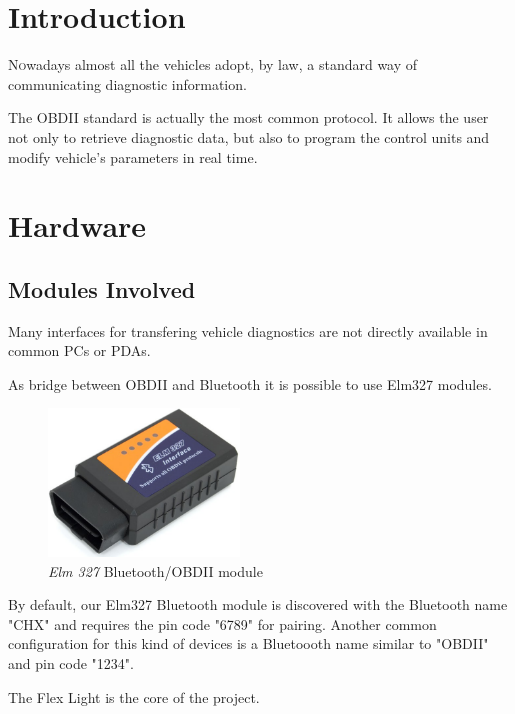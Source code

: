 \documentclass[twoside]{article}
\begin{document}
\begin{multicols}{2} %

\section{Introduction}

\lettrine[nindent=0em,lines=2]{N} owadays almost all the vehicles adopt, by law, a standard way of communicating diagnostic information.

The OBDII standard is actually the most common protocol. It allows the user not only to retrieve diagnostic data, but also to program the control units and modify vehicle's parameters in real time.


\section{Hardware}

\subsection{Modules Involved}

Many interfaces for transfering vehicle diagnostics are not directly available in common PCs or PDAs.

As bridge between OBDII and Bluetooth it is possible to use Elm327 modules.

\begin{figure}[H]
  \centering
  \includegraphics[width=2in]{img/elm_327_presentation}
  \caption{\textit{Elm 327} Bluetooth/OBDII module}
\end{figure}

By default, our Elm327 Bluetooth module is discovered with the Bluetooth name "CHX" and requires the pin code "6789" for pairing.
Another common configuration for this kind of devices is a Bluetoooth name similar to "OBDII" and pin code "1234".

The Flex Light is the core of the project.


\end{multicols}
\end{document}
